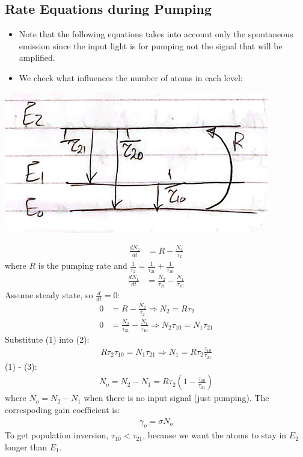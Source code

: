 \documentclass[11pt]{article}
\begin{document}
\subsection{Rate Equations during Pumping}
\begin{itemize}
    \item Note that the following equations takes into account only the spontaneous emission since the input light is for pumping not the signal that will be amplified.
    \item We check what influences the number of atoms in each level:
\end{itemize}

\begin{center}
    \includegraphics[scale=1]{2.png}
\end{center}
\begin{align*}
    \frac{dN_2}{dt} &= R - \frac{N_2}{\tau_{2}}
\end{align*}
where $R$ is the pumping rate and $\frac{1}{\tau_{2}} = \frac{1}{\tau_{21}} + \frac{1}{\tau_{20}}$ 
\begin{align*}
    \frac{dN_1}{dt} &= \frac{N_2}{\tau_{21}} - \frac{N_1}{\tau_{10}}
\end{align*}
Assume steady state, so $\frac{d}{dt} = 0$:
\begin{align}
    0 &= R - \frac{N_2}{\tau_{2}} \Rightarrow N_2 = R \tau_2 \\
    0 &= \frac{N_2}{\tau_{21}} - \frac{N_1}{\tau_{10}} \Rightarrow N_2 \tau_{10} = N_1 \tau_{21}
\end{align}
Substitute (1) into (2):
\begin{align}
    R \tau_2 \tau_{10} = N_1 \tau_{21} \Rightarrow N_1 = R \tau_2 \frac{\tau_{10}}{\tau_{21}}
\end{align}
(1) - (3):
\begin{align*}
    N_o = N_2 - N_1 = R \tau_2 \left(1 - \frac{\tau_{10}}{\tau_{21}}\right)
\end{align*}
where $N_o = N_2 - N_1$ when there is no input signal (just pumping). The correspoding gain coefficient is:
\begin{align*}
    \gamma_o = \sigma N_o
\end{align*}
To get population inversion, $\tau_{10} < \tau_{21}$, because we want the atoms to stay in $E_2$ longer than $E_1$.
\end{document}
